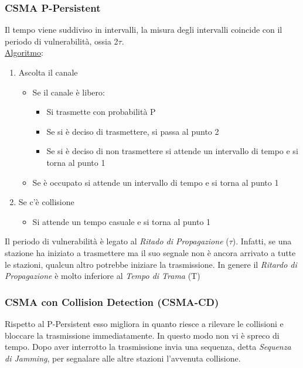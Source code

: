 \documentclass{article}
\begin{document}
            \subsubsection{CSMA P-Persistent}
                Il tempo viene suddiviso in intervalli, la misura degli intervalli coincide con il periodo di vulnerabilità, ossia 2$\tau$. \\
                \underline{Algoritmo}:
                \begin{enumerate}
                    \item Ascolta il canale
                        \begin{itemize}
                            \item Se il canale è libero:
                                  \begin{itemize}
                                    \item Si trasmette con probabilità P
                                    \item Se si è deciso di trasmettere, si passa al punto 2
                                    \item Se si è deciso di non trasmettere si attende un intervallo di tempo e si torna al punto 1
                                  \end{itemize}
                            \item Se è occupato si attende un intervallo di tempo e si torna al punto 1 
                        \end{itemize} 
                    \item Se c'è collisione
                        \begin{itemize}
                            \item Si attende un tempo casuale e si torna al punto 1
                        \end{itemize}
                \end{enumerate}
                Il periodo di vulnerabilità è legato al \textit{Ritado di Propagazione} ($\tau$). Infatti, se una stazione ha iniziato a trasmettere ma il suo segnale non è ancora arrivato a tutte le stazioni, qualcun altro potrebbe iniziare la trasmissione. In genere il \textit{Ritardo di Propagazione} è molto inferiore al \textit{Tempo di Trama} (T)

            \subsubsection{CSMA con Collision Detection (CSMA-CD)}
                Rispetto al P-Persistent esso migliora in quanto riesce a rilevare le collisioni e bloccare la trasmissione immediatamente. In questo modo non vi è spreco di tempo. Dopo aver interrotto la trasmissione invia una sequenza, detta \textit{Sequenza di Jamming}, per segnalare alle altre stazioni l'avvenuta collisione.
                
\end{document}
